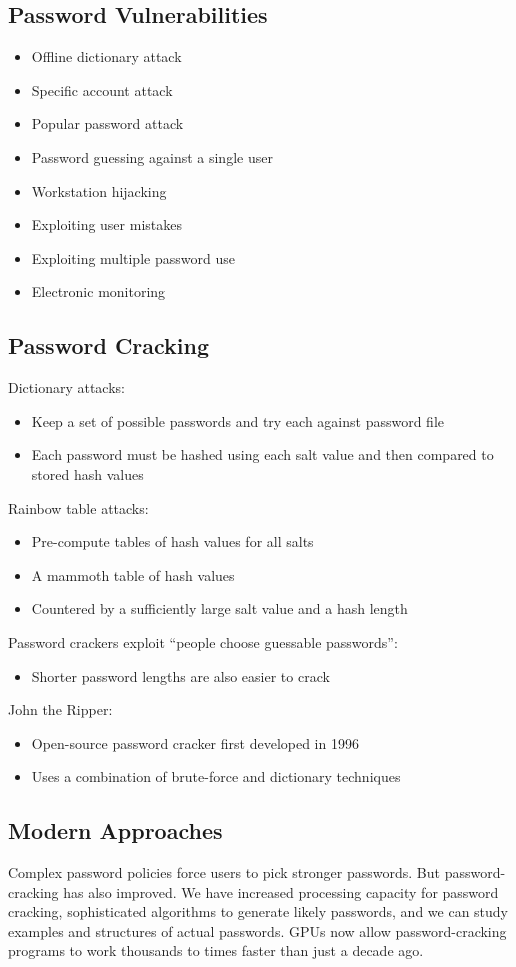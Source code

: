 \documentclass{math}
\begin{document}
\subsection*{Password Vulnerabilities}
\begin{itemize}
  \item Offline dictionary attack
  \item Specific account attack
  \item Popular password attack
  \item Password guessing against a single user
  \item Workstation hijacking
  \item Exploiting user mistakes
  \item Exploiting multiple password use
  \item Electronic monitoring
\end{itemize}

\subsection*{Password Cracking}
Dictionary attacks:
\begin{itemize}
  \item Keep a set of possible passwords and try each against password file
  \item Each password must be hashed using each salt value and then compared to
  stored hash values
\end{itemize}
Rainbow table attacks:
\begin{itemize}
  \item Pre-compute tables of hash values for all salts
  \item A mammoth table of hash values
  \item Countered by a sufficiently large salt value and a hash length
\end{itemize}
Password crackers exploit ``people choose guessable passwords'':
\begin{itemize}
  \item Shorter password lengths are also easier to crack
\end{itemize}
John the Ripper:
\begin{itemize}
  \item Open-source password cracker first developed in 1996
  \item Uses a combination of brute-force and dictionary techniques
\end{itemize}

\subsection*{Modern Approaches}
Complex password policies force users to pick stronger passwords. But
password-cracking has also improved. We have increased processing capacity
for password cracking, sophisticated algorithms to generate likely passwords,
and we can study examples and structures of actual passwords. GPUs now allow
password-cracking programs to work thousands to times faster than just a decade
ago.
\end{document}

